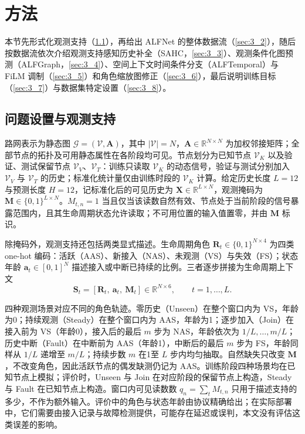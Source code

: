\section{方法}\label{sec:method}
本节先形式化观测支持（\ref{sec:3_1}），再给出 ALFNet 的整体数据流（\ref{sec:3_2}），随后按数据流依次介绍观测支持感知历史补全（SAHC，\ref{sec:3_3}）、观测条件化图预测（ALFGraph，\ref{sec:3_4}）、空间上下文时间条件分支（ALFTemporal）与 FiLM 调制（\ref{sec:3_5}）和角色缩放图修正（\ref{sec:3_6}），最后说明训练目标（\ref{sec:3_7}）与数据集特定设置（\ref{sec:3_8}）。

\subsection{问题设置与观测支持}\label{sec:3_1}

路网表示为静态图 $\mathcal{G}=(\mathcal{V},\mathbf{A})$，其中 $|\mathcal{V}|=N$，$\mathbf{A}\in\mathbb{R}^{N\times N}$ 为加权邻接矩阵；全部节点的拓扑及可用静态属性在各阶段均可见。节点划分为已知节点 $\mathcal{V}_K$ 以及验证、测试保留节点 $\mathcal{V}_V$、$\mathcal{V}_T$：训练只读取 $\mathcal{V}_K$ 的动态信号，验证与测试分别加入 $\mathcal{V}_V$ 与 $\mathcal{V}_T$ 的历史；标准化统计量仅由训练时段的 $\mathcal{V}_K$ 计算。给定历史长度 $L=12$ 与预测长度 $H=12$，记标准化后的可见历史为 $\mathbf{X}\in\mathbb{R}^{L\times N}$，观测掩码为 $\mathbf{M}\in\{0,1\}^{L\times N}$。$M_{t,n}=1$ 当且仅当该读数自然有效、节点处于当前阶段的信号暴露范围内，且其生命周期状态允许读取；不可用位置的输入值置零，并由 $\mathbf{M}$ 标识。

除掩码外，观测支持还包括两类显式描述。生命周期角色 $\mathbf{R}_t\in\{0,1\}^{N\times4}$ 为四类 one-hot 编码：活跃（AAS）、新接入（NAS）、未观测（VS）与失效（FS）；状态年龄 $\mathbf{a}_t\in[0,1]^{N}$ 描述接入或中断已持续的比例。三者逐步拼接为生命周期上下文
\begin{equation}\label{eq:1}
\mathbf{S}_t=[\mathbf{R}_t,\ \mathbf{a}_t,\ \mathbf{M}_t]\in\mathbb{R}^{N\times 6},\qquad t=1,\dots,L.
\end{equation}

四种观测场景对应不同的角色轨迹。零历史（Unseen）在整个窗口内为 VS，年龄为0；持续观测（Steady）在整个窗口内为 AAS，年龄为1；逐步加入（Join）在接入前为 VS（年龄0），接入后的最后 $m$ 步为 NAS，年龄依次为 $1/L,\dots,m/L$；历史中断（Fault）在中断前为 AAS（年龄1），中断后的最后 $m$ 步为 FS，年龄同样从 $1/L$ 递增至 $m/L$；持续步数 $m$ 在1至 $L$ 步内均匀抽取。自然缺失只改变 $\mathbf{M}$，不改变角色，因此活跃节点的偶发缺测仍记为 AAS。训练阶段四种场景均在已知节点上模拟；评价时，Unseen 与 Join 在对应阶段的保留节点上构造，Steady 与 Fault 在已知节点上构造。窗口内可见读数数 $q_n=\sum_t M_{t,n}$ 只用于描述支持的多少，不作为额外输入。评价中的角色与状态年龄由协议精确给出；在实际部署中，它们需要由接入记录与故障检测提供，可能存在延迟或误判，本文没有评估这类误差的影响。


